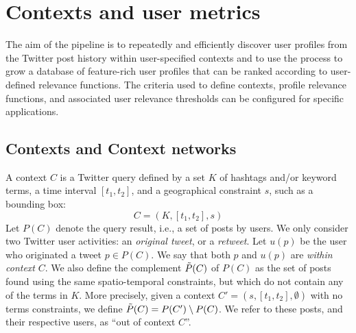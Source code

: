 \vspace{-10pt}
\section{Contexts and user metrics}
\vspace{-5pt}


The aim of the pipeline is to repeatedly and efficiently discover user profiles from the Twitter post history within user-specified contexts and to use the process to grow a database of feature-rich user profiles that can be ranked according to user-defined relevance functions. 
The criteria used to define contexts, profile relevance functions, and associated user relevance thresholds can be configured for specific applications.

\subsection{Contexts and Context networks} \label{sec:contexts}
\vspace{-5pt}

A context $C$ is a Twitter query defined by a set $K$ of hashtags and/or keyword terms, a time interval $[t_1, t_2]$, and a geographical constraint  $s$, such as  a bounding box:
\begin{equation}
C = (K, [t_1, t_2], s)
\label{eq:context}
\end{equation}
Let $P(C)$ denote the query result, i.e., a set of posts by users.
We only consider two Twitter user activities: an \textit{original tweet}, or a \textit{retweet}.
Let $u(p)$ be the user who originated a tweet $p \in P(C)$.
We say that both $p$ and $u(p)$ are \textit{within context} $C$.
%
We also define the complement $\Tilde{P}(C)$ of $P(C)$ as the set of posts found using the same spatio-temporal constraints, but which do not contain any of the terms in $K$. More precisely, given a context $C'= ( s, [t_1, t_2], \emptyset )$ with no terms constraints, we define $\Tilde{P}(C) = P(C') \setminus P(C)$. 
We refer to these posts, and their respective users, as ``out of context $C$''.

